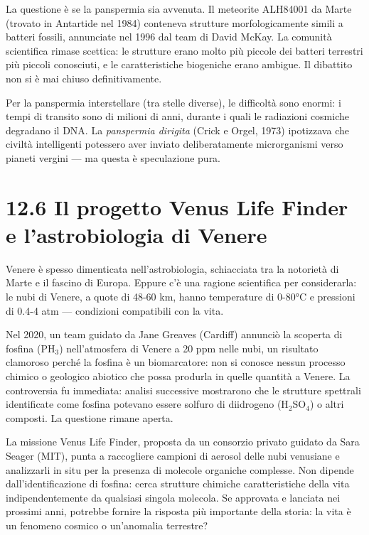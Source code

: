 \documentclass[11.5pt,a4paper,openany]{book}
\theoremstyle{remark}
\begin{document}
La questione è se la panspermia sia avvenuta. Il meteorite ALH84001 da Marte (trovato in Antartide nel 1984) conteneva strutture morfologicamente simili a batteri fossili, annunciate nel 1996 dal team di David McKay. La comunità scientifica rimase scettica: le strutture erano molto più piccole dei batteri terrestri più piccoli conosciuti, e le caratteristiche biogeniche erano ambigue. Il dibattito non si è mai chiuso definitivamente.

Per la panspermia interstellare (tra stelle diverse), le difficoltà sono enormi: i tempi di transito sono di milioni di anni, durante i quali le radiazioni cosmiche degradano il DNA. La \textit{panspermia dirigita} (Crick e Orgel, 1973) ipotizzava che civiltà intelligenti potessero aver inviato deliberatamente microrganismi verso pianeti vergini --- ma questa è speculazione pura.

\section{12.6 Il progetto Venus Life Finder e l'astrobiologia di Venere}

Venere è spesso dimenticata nell'astrobiologia, schiacciata tra la notorietà di Marte e il fascino di Europa. Eppure c'è una ragione scientifica per considerarla: le nubi di Venere, a quote di 48-60 km, hanno temperature di 0-80°C e pressioni di 0.4-4 atm --- condizioni compatibili con la vita.

Nel 2020, un team guidato da Jane Greaves (Cardiff) annunciò la scoperta di fosfina (PH$_3$) nell'atmosfera di Venere a 20 ppm nelle nubi, un risultato clamoroso perché la fosfina è un biomarcatore: non si conosce nessun processo chimico o geologico abiotico che possa produrla in quelle quantità a Venere. La controversia fu immediata: analisi successive mostrarono che le strutture spettrali identificate come fosfina potevano essere solfuro di diidrogeno (H$_2$SO$_4$) o altri composti. La questione rimane aperta.

La missione Venus Life Finder, proposta da un consorzio privato guidato da Sara Seager (MIT), punta a raccogliere campioni di aerosol delle nubi venusiane e analizzarli in situ per la presenza di molecole organiche complesse. Non dipende dall'identificazione di fosfina: cerca strutture chimiche caratteristiche della vita indipendentemente da qualsiasi singola molecola. Se approvata e lanciata nei prossimi anni, potrebbe fornire la risposta più importante della storia: la vita è un fenomeno cosmico o un'anomalia terrestre?
\end{document}
